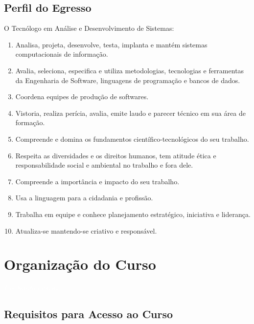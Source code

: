 \documentclass[11pt,fleqn]{book} %
\begin{document}
\section{Perfil do Egresso}
O Tecnólogo em Análise e Desenvolvimento de Sistemas:
\begin{enumerate}
	\item Analisa, projeta, desenvolve, testa, implanta e mantém sistemas computacionais de informação. 
	\item Avalia, seleciona, especifica e utiliza metodologias, tecnologias e ferramentas da Engenharia de Software, linguagens de programação e bancos de dados. 
	\item Coordena equipes de produção de softwares.
	\item Vistoria, realiza perícia, avalia, emite laudo e parecer técnico em sua área de formação.
	\item Compreende e domina os fundamentos científico-tecnológicos do seu trabalho.
	\item Respeita as diversidades e os direitos humanos, tem atitude ética e responsabilidade social e ambiental no trabalho e fora dele.
	\item Compreende a importância e impacto do seu trabalho.
	\item Usa a linguagem para a cidadania e profissão.
	\item Trabalha em equipe e conhece planejamento estratégico, iniciativa e liderança.
\item 	Atualiza-se mantendo-se criativo e responsável.
\end{enumerate}



\chapter{Organização do Curso}\label{organizacao}
\vspace{6em}
\begin{flushright}
	\textit{\textcolor{white}{Um bonita citação...}}
\end{flushright}
\vspace{12em}

\section{Requisitos para Acesso ao Curso}
\end{document}
